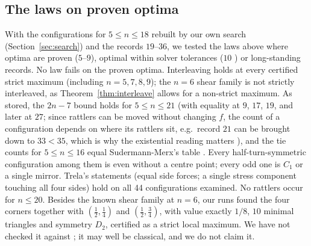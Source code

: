 \documentclass[11pt]{amsart}
\theoremstyle{definition}
\begin{document}
\subsection{The laws on proven optima}
With the configurations for $5 \le n \le 18$ rebuilt by our own search (Section~\ref{sec:search}) and the records $19$--$36$, we tested the laws above where optima are proven ($5$--$9$), optimal within solver tolerances ($10$ \cite{SM}) or long-standing records. No law fails on the proven optima. Interleaving holds at every certified strict maximum (including $n = 5, 7, 8, 9$); the $n = 6$ shear family is not strictly interleaved, as Theorem~\ref{thm:interleave} allows for a non-strict maximum. As stored, the $2n-7$ bound holds for $5 \le n \le 21$ (with equality at $9$, $17$, $19$, and later at $27$; since rattlers can be moved without changing $f$, the count of a configuration depends on where its rattlers sit, e.g.\ record $21$ can be brought down to $33 < 35$, which is why the existential reading matters \cite{Note2}), and the tie counts for $5 \le n \le 16$ equal Sudermann-Merx's table \cite[Table~10]{SM}. Every half-turn-symmetric configuration among them is even without a centre point; every odd one is $C_1$ or a single mirror. Trela's statements (equal side forces; a single stress component touching all four sides) hold on all 44 configurations examined. No rattlers occur for $n \le 20$. %
Besides the known shear family at $n = 6$, our runs found the four corners together with $(\tfrac12,\tfrac14)$ and $(\tfrac12,\tfrac34)$, with value exactly $1/8$, $10$ minimal triangles and symmetry $D_2$, certified as a strict local maximum. We have not checked it against \cite{DYZ}; it may well be classical, and we do not claim it. %
\end{document}
